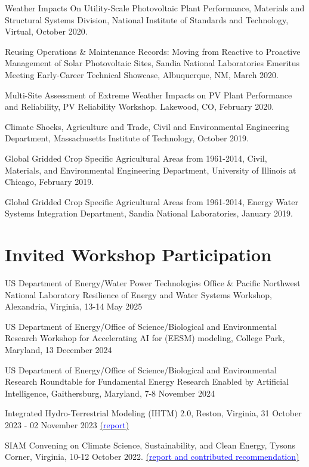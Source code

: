 \documentclass{article}[12pt]
\begin{document}
\begin{etaremune}[]
		\item Weather Impacts On Utility-Scale Photovoltaic Plant Performance, Materials and Structural Systems Division, National Institute of Standards and Technology, Virtual, October 2020.
		
		\item Reusing Operations \& Maintenance Records: Moving from Reactive to Proactive Management of Solar Photovoltaic Sites, Sandia National Laboratories Emeritus Meeting Early-Career Technical Showcase, Albuquerque, NM, March 2020.
		
		\item Multi-Site Assessment of Extreme Weather Impacts on PV Plant Performance and Reliability, PV Reliability Workshop. Lakewood, CO, February 2020. 
		
		\item Climate Shocks, Agriculture and Trade, Civil and Environmental Engineering Department, Massachusetts Institute of Technology, October 2019. 
		
		\item Global Gridded Crop Specific Agricultural Areas from 1961-2014, Civil, Materials, and Environmental Engineering Department, University of Illinois at Chicago, February 2019.    
		\item Global Gridded Crop Specific Agricultural Areas from 1961-2014, Energy Water Systems Integration Department, Sandia National Laboratories, January 2019.    
		
	\end{etaremune}
	
	
	\section*{Invited Workshop Participation}
	
	\begin{etaremune}[]
		\item US Department of Energy/Water Power Technologies Office \& Pacific Northwest National Laboratory Resilience of Energy and Water Systems Workshop, Alexandria, Virginia, 13-14 May 2025
		\item US Department of Energy/Office of Science/Biological and Environmental Research Workshop for Accelerating AI for (EESM) modeling, College Park, Maryland, 13 December 2024
		\item US Department of Energy/Office of Science/Biological and Environmental Research Roundtable for Fundamental Energy Research Enabled by Artificial Intelligence, Gaithersburg, Maryland, 7-8 November 2024 
		\item Integrated Hydro-Terrestrial Modeling (IHTM) 2.0, Reston, Virginia, 31 October 2023 - 02 November 2023 \href{https://doi.org/10.2172/2499550}{(\textcolor{blue}{report})} 
		\item SIAM Convening on Climate Science, Sustainability, and Clean Energy, Tysons Corner, Virginia, 10-12 October 2022. \href{https://www.siam.org/Portals/0/Programs/climate_convening/Report_SIAMClimateConvening.pdf}{(\textcolor{blue}{report and contributed recommendation})} 
	\end{etaremune}
	
\end{document}
